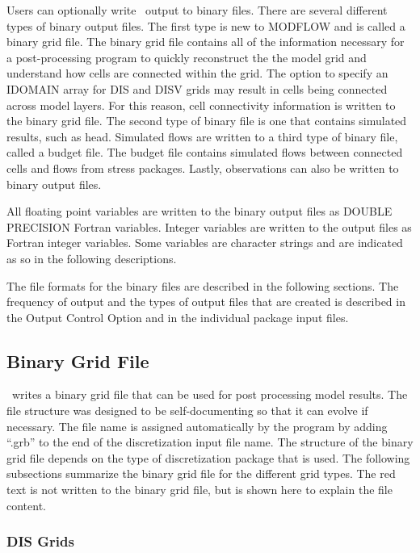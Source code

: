 Users can optionally write \mf~output to binary files.  There are several different types of binary output files.  The first type is new to MODFLOW and is called a binary grid file.  The binary grid file contains all of the information necessary for a post-processing program to quickly reconstruct the the model grid and understand how cells are connected within the grid.  The option to specify an IDOMAIN array for DIS and DISV grids may result in cells being connected across model layers.  For this reason, cell connectivity information is written to the binary grid file. The second type of binary file is one that contains simulated results, such as head.  Simulated flows are written to a third type of binary file, called a budget file.  The budget file contains simulated flows between connected cells and flows from stress packages.  Lastly, observations can also be written to binary output files.

All floating point variables are written to the binary output files as DOUBLE PRECISION Fortran variables. Integer variables are written to the output files as Fortran integer variables. Some variables are character strings and are indicated as so in the following descriptions.

The file formats for the binary files are described in the following sections. The frequency of output and the types of output files that are created is described in the Output Control Option and in the individual package input files.

\newpage
\subsection{Binary Grid File}
\mf~writes a binary grid file that can be used for post processing model results.  The file structure was designed to be self-documenting so that it can evolve if necessary.  The file name is assigned automatically by the program by adding ``.grb'' to the end of the discretization input file name.  The structure of the binary grid file depends on the type of discretization package that is used.  The following subsections summarize the binary grid file for the different grid types.  The red text is not written to the binary grid file, but is shown here to explain the file content.

\newpage
\subsubsection{DIS Grids}

